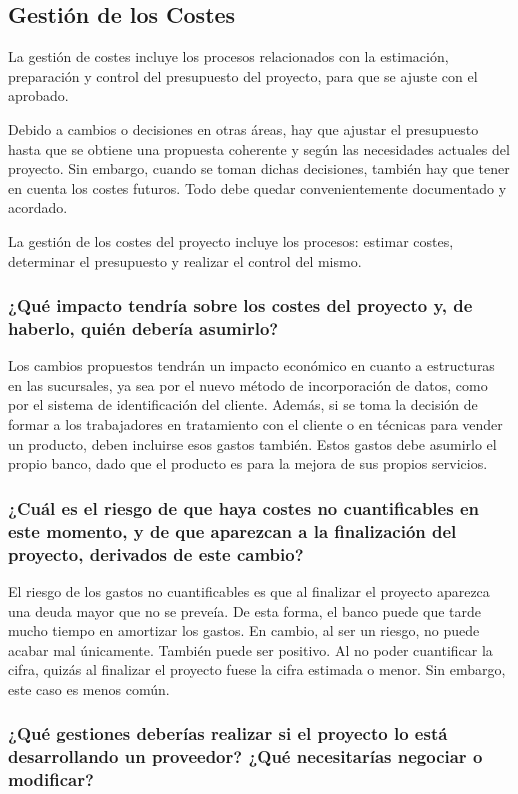 \documentclass{article}
\begin{document}
\subsection{Gestión de los Costes}
La gestión de costes incluye los procesos relacionados con la estimación, preparación y control del presupuesto del proyecto, para que se ajuste con el aprobado.

Debido a cambios o decisiones en otras áreas, hay que ajustar el presupuesto hasta que se obtiene una propuesta coherente y según las necesidades actuales del proyecto. Sin embargo, cuando se toman dichas decisiones, también hay que tener en cuenta los costes futuros. Todo debe quedar convenientemente documentado y acordado.

La gestión de los costes del proyecto incluye los procesos: estimar costes, determinar el presupuesto y realizar el control del mismo.

\subsubsection{¿Qué impacto tendría sobre los costes del proyecto y, de haberlo, quién debería asumirlo?}

Los cambios propuestos tendrán un impacto económico en cuanto a estructuras en las sucursales, ya sea por el nuevo método de incorporación de datos, como por el sistema de identificación del cliente. Además, si se toma la decisión de formar a los trabajadores en tratamiento con el cliente o en técnicas para vender un producto, deben incluirse esos gastos también. Estos gastos debe asumirlo el propio banco, dado que el producto es para la mejora de sus propios servicios.

\subsubsection{¿Cuál es el riesgo de que haya costes no cuantificables en este momento, y de que aparezcan a la finalización del proyecto, derivados de este cambio?}

El riesgo de los gastos no cuantificables es que al finalizar el proyecto aparezca una deuda mayor que no se preveía. De esta forma, el banco puede que tarde mucho tiempo en amortizar los gastos. En cambio, al ser un riesgo, no puede acabar mal únicamente. También puede ser positivo. Al no poder cuantificar la cifra, quizás al finalizar el proyecto fuese la cifra estimada o menor. Sin embargo, este caso es menos común.

\subsubsection{¿Qué gestiones deberías realizar si el proyecto lo está desarrollando un proveedor? ¿Qué necesitarías negociar o modificar?}
\end{document}
